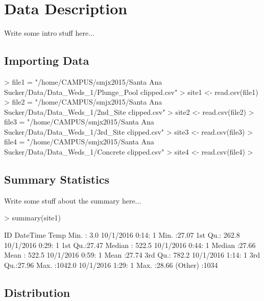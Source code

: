 \documentclass{article}
\begin{document}


\section{Data Description}

Write some intro stuff here...


\subsection{Importing Data}


\begin{Schunk}
\begin{Sinput}
> file1 = "/home/CAMPUS/smjx2015/Santa Ana Sucker/Data/Data_Weds_1/Plunge_Pool clipped.csv"
> site1 <- read.csv(file1)
> file2 = "/home/CAMPUS/smjx2015/Santa Ana Sucker/Data/Data_Weds_1/2nd_Site clipped.csv"
> site2 <- read.csv(file2)
> file3 = "/home/CAMPUS/smjx2015/Santa Ana Sucker/Data/Data_Weds_1/3rd_Site clipped.csv"
> site3 <- read.csv(file3)
> file4 = "/home/CAMPUS/smjx2015/Santa Ana Sucker/Data/Data_Weds_1/Concrete clipped.csv"
> site4 <- read.csv(file4)
> 
\end{Sinput}
\end{Schunk}


\subsection{Summary Statistics}

Write some stuff about the summary here...
\begin{Schunk}
\begin{Sinput}
> summary(site1)
\end{Sinput}
\begin{Soutput}
       ID                   DateTime         Temp      
 Min.   :   3.0   10/1/2016 0:14:   1   Min.   :27.07  
 1st Qu.: 262.8   10/1/2016 0:29:   1   1st Qu.:27.47  
 Median : 522.5   10/1/2016 0:44:   1   Median :27.66  
 Mean   : 522.5   10/1/2016 0:59:   1   Mean   :27.74  
 3rd Qu.: 782.2   10/1/2016 1:14:   1   3rd Qu.:27.96  
 Max.   :1042.0   10/1/2016 1:29:   1   Max.   :28.66  
                  (Other)       :1034                  
\end{Soutput}
\end{Schunk}

\subsection{Distribution}
\end{document}
